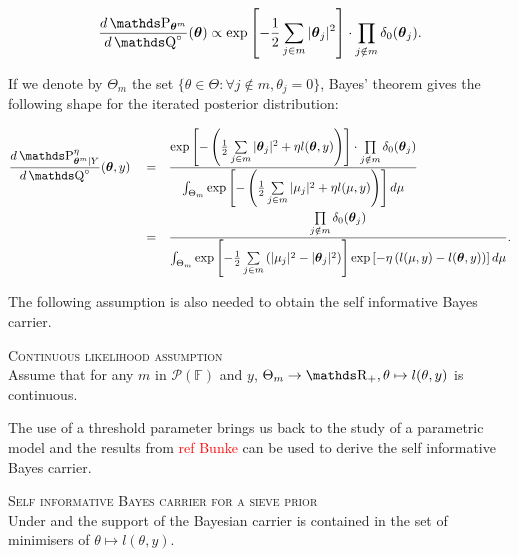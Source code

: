 \[\frac{d\P_{\boldsymbol{\theta}^{m}}}{d\Q^{\circ}}(\boldsymbol{\theta}) \propto  \exp\left[-\frac{1}{2}\sum\limits_{j \in m} \vert \boldsymbol{\theta}_{j} \vert^{2} \right] \cdot \prod\limits_{j \notin m} \delta_{0}(\boldsymbol{\theta}_{j}).\]

If we denote by $\Theta_{m}$ the set $\{\theta \in \Theta : \forall j \notin m, \theta_{j} = 0\}$, Bayes' theorem gives the following shape for the iterated posterior distribution:

\begin{alignat*}{3}
& \frac{d\P_{\boldsymbol{\theta}^{m}\vert Y}^{\eta}}{d\Q^{\circ}}(\boldsymbol{\theta}, y)&& = && \frac{\exp\left[-\left(\frac{1}{2}\sum\limits_{j \in m} \vert \boldsymbol{\theta}_{j} \vert^{2} + \eta l(\boldsymbol{\theta}, y)\right)\right] \cdot \prod\limits_{j \notin m} \delta_{0}(\boldsymbol{\theta}_{j})}{\int_{\Theta_{m}} \exp\left[-\left(\frac{1}{2}\sum\limits_{j \in m} \vert \mu_{j} \vert^{2} + \eta l(\mu, y)\right)\right] d\mu}\\
& && = && \frac{\prod\limits_{j \notin m} \delta_{0}(\boldsymbol{\theta}_{j})}{\int_{\Theta_{m}} \exp\left[-\frac{1}{2}\sum\limits_{j \in m} \left(\vert \mu_{j} \vert^{2} - \vert \boldsymbol{\theta}_{j} \vert^{2}\right)\right]\exp\left[-\eta\left(l(\mu, y) - l(\boldsymbol{\theta}, y)\right)\right] d\mu}.
\end{alignat*}

The following assumption is also needed to obtain the self informative Bayes carrier.

\begin{as}{\textsc{Continuous likelihood assumption}\\}\label{AS_BAYES_SIEVE_CONTINUOUS}
Assume that for any $m$ in $\mathcal{P}(\mathds{F})$ and $y$, $\Theta_{m} \rightarrow \R_{+}, \theta \mapsto l(\theta, y)$ is continuous.
\end{as}

The use of a threshold parameter brings us back to the study of a parametric model and the results from \textcolor{red}{ref Bunke} can be used to derive the self informative Bayes carrier.

\begin{thm}{\textsc{Self informative Bayes carrier for a sieve prior}\\}\label{THM_BAYES_SIEVE_SELF_INFORMATIVE}
Under  and  the support of the Bayesian carrier is contained in the set of minimisers of $\theta \mapsto l(\theta, y)$.
\end{thm}

